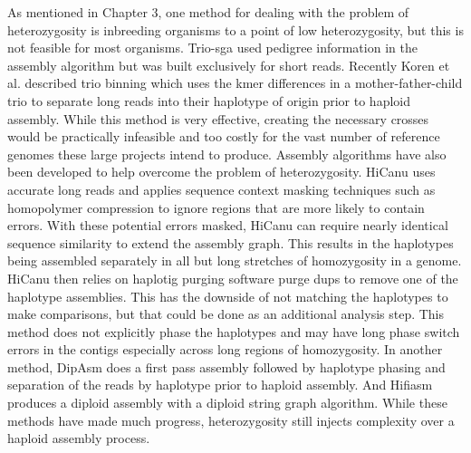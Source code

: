 \par{
As mentioned in Chapter 3, one method for dealing with the problem of heterozygosity is inbreeding organisms to a point of low heterozygosity\cite{drosophila}, 
but this is not feasible for most organisms. Trio-sga used pedigree information in the assembly algorithm\cite{trio-sga} 
but was built exclusively for short reads. Recently Koren et al. described trio binning which uses the kmer differences in a mother-father-child trio to 
separate long reads into their haplotype of origin prior to haploid assembly\cite{triobinning}. 
While this method is very effective, creating the necessary crosses would be practically infeasible and too costly for the vast number of reference genomes these large projects intend to produce. 
Assembly algorithms have also been developed to help overcome the problem of heterozygosity. HiCanu uses accurate long reads and applies sequence context masking techniques such as homopolymer compression to ignore regions that are more likely to contain errors. With these potential errors masked, HiCanu can 
require nearly identical sequence similarity to extend the assembly graph\cite{HICANU}. This results in the haplotypes being assembled separately in all but long stretches of homozygosity in 
a genome. HiCanu then relies on haplotig purging software purge dups\cite{purgedups} to remove one of the haplotype assemblies. This has the downside of not matching the haplotypes to make comparisons, but that could be done as an additional analysis step. This method does not explicitly phase the haplotypes and may have long phase switch errors in the contigs especially across long regions of homozygosity. In another method, DipAsm does a first pass assembly followed by haplotype phasing and separation of the reads by haplotype prior to haploid assembly\cite{Garg2021}. And Hifiasm produces a diploid assembly with a diploid string graph algorithm\cite{hifiasm}. While these methods have made much progress, heterozygosity still injects complexity over a haploid assembly process.
} 

